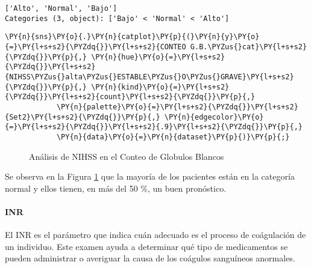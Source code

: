             \begin{tcolorbox}[breakable, size=fbox, boxrule=.5pt, pad at break*=1mm, opacityfill=0]
\begin{Verbatim}[commandchars=\\\{\}]
['Alto', 'Normal', 'Bajo']
Categories (3, object): ['Bajo' < 'Normal' < 'Alto']
\end{Verbatim}
\end{tcolorbox}
        
    \begin{tcolorbox}[breakable, size=fbox, boxrule=1pt, pad at break*=1mm,colback=cellbackground, colframe=cellborder]
\begin{Verbatim}[commandchars=\\\{\}]
\PY{n}{sns}\PY{o}{.}\PY{n}{catplot}\PY{p}{(}\PY{n}{y}\PY{o}{=}\PY{l+s+s2}{\PYZdq{}}\PY{l+s+s2}{CONTEO G.B.\PYZus{}cat}\PY{l+s+s2}{\PYZdq{}}\PY{p}{,} \PY{n}{hue}\PY{o}{=}\PY{l+s+s2}{\PYZdq{}}\PY{l+s+s2}{NIHSS\PYZus{}alta\PYZus{}ESTABLE\PYZus{}O\PYZus{}GRAVE}\PY{l+s+s2}{\PYZdq{}}\PY{p}{,} \PY{n}{kind}\PY{o}{=}\PY{l+s+s2}{\PYZdq{}}\PY{l+s+s2}{count}\PY{l+s+s2}{\PYZdq{}}\PY{p}{,}
            \PY{n}{palette}\PY{o}{=}\PY{l+s+s2}{\PYZdq{}}\PY{l+s+s2}{Set2}\PY{l+s+s2}{\PYZdq{}}\PY{p}{,} \PY{n}{edgecolor}\PY{o}{=}\PY{l+s+s2}{\PYZdq{}}\PY{l+s+s2}{.9}\PY{l+s+s2}{\PYZdq{}}\PY{p}{,}
            \PY{n}{data}\PY{o}{=}\PY{n}{dataset}\PY{p}{)}\PY{p}{;}
\end{Verbatim}
\end{tcolorbox}

\begin{center}
    	\begin{figure}[H]
	\centering
	\caption{Análisis de NIHSS en el Conteo de Globulos Blancos}
	\label{fig:aNISScg}
	\end{figure}
\end{center}
    
    Se observa en la Figura \ref{fig:aNISScg} que la mayoría de los pacientes están en la categoría normal y ellos tienen, en más del 50 \%, un buen pronóstico.

    \hypertarget{inr}{%
\paragraph{INR}\label{inr}}

El INR es el parámetro que indica cuán adecuado es el proceso de coágulación de un individuo. Este examen ayuda a determinar qué tipo de medicamentos se pueden administrar o averiguar la causa de los coágulos sanguíneos anormales.

